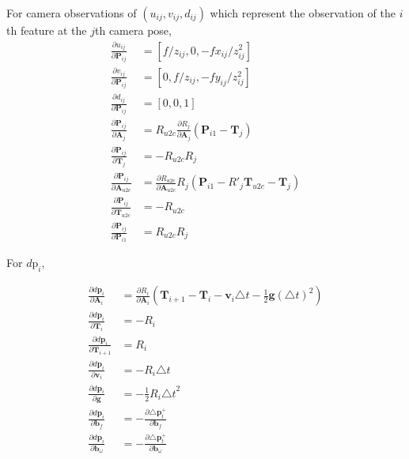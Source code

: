 \documentclass[12pt]{article}   %
\begin{document}
For camera observations of $(u_{ij}, v_{ij}, d_{ij})$ which represent the observation of the $i$th feature at the $j$th camera pose, 
\begin{align}
\frac{\partial u_{ij}}{\partial \textbf{P}_{ij}} &= [f/z_{ij}, 0, -fx_{ij}/z^2_{ij}] \\
\frac{\partial v_{ij}}{\partial \textbf{P}_{ij}} &= [0, f/z_{ij}, -fy_{ij}/z^2_{ij}] \\
\frac{\partial d_{ij}}{\partial \textbf{P}_{ij}} &= [0, 0, 1] \\
\frac{\partial \textbf{P}_{ij}}{\partial \textbf{A}_{j}} &= R_{u2c} \frac{\partial R_{j}}{\partial \textbf{A}_{j}} (\textbf{P}_{i1} - \textbf{T}_{j}) \\
\frac{\partial \textbf{P}_{ij}}{\partial \textbf{T}_{j}} &= -R_{u2c} R_{j} \\
\frac{\partial \textbf{P}_{ij}}{\partial \textbf{A}_{u2c}} &= \frac{\partial R_{u2c}}{\partial \textbf{A}_{u2c}} R_{j}(\textbf{P}_{i1} - R'_{j} \textbf{T}_{u2c} - \textbf{T}_{j}) \\
\frac{\partial \textbf{P}_{ij}}{\partial \textbf{T}_{u2c}} &= -R_{u2c}\\
\frac{\partial \textbf{P}_{ij}}{\partial \textbf{P}_{i1}} &= R_{u2c} R_{j} 
\end{align}

For $d\text{p}_{i}$,

\begin{align}
\frac{\partial d\textbf{p}_{i}}{\partial \textbf{A}_{i}} &= \frac{\partial R_i}{\partial \textbf{A}_i} (\textbf{T}_{i+1} - \textbf{T}_i - \textbf{v}_i \triangle t - \frac{1}{2} \textbf{g} {(\triangle t)}^2) \\
\frac{\partial d\textbf{p}_{i}}{\partial \textbf{T}_{i}} &= -R_i \\
\frac{\partial d\textbf{p}_{i}}{\partial \textbf{T}_{i+1}} &= R_i \\
\frac{\partial d\textbf{p}_{i}}{\partial \textbf{v}_{i}} &= -R_i \triangle t \\
\frac{\partial d\textbf{p}_{i}}{\partial \textbf{g}} &= -\frac{1}{2} R_i {\triangle t}^2 \\
\frac{\partial d\textbf{p}_{i}}{\partial \textbf{b}_f} &= - \frac{\partial \triangle \textbf{p}^+_t}{\partial \textbf{b}_f}\\
\frac{\partial d\textbf{p}_{i}}{\partial \textbf{b}_\omega} &= - \frac{\partial \triangle \textbf{p}^+_t}{\partial \textbf{b}_\omega}
\end{align}
\end{document}
